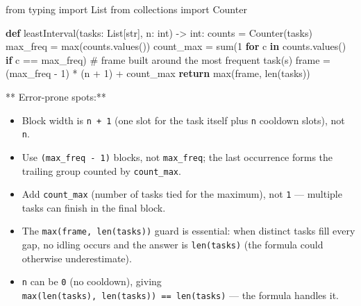 \documentclass[11pt]{article}
\providecommand{\tightlist}{\setlength{\itemsep}{1pt}\setlength{\parskip}{0pt}}
\newenvironment{Shaded}{\begin{snugshade}}{\end{snugshade}}
\newcommand{\BuiltInTok}[1]{\textcolor[rgb]{0.50,0.55,0.55}{#1}}
\newcommand{\CommentTok}[1]{\textcolor[rgb]{0.48,0.49,0.49}{#1}}
\newcommand{\ControlFlowTok}[1]{\textcolor[rgb]{0.99,0.74,0.29}{\textbf{#1}}}
\newcommand{\DecValTok}[1]{\textcolor[rgb]{0.96,0.45,0.00}{#1}}
\newcommand{\ImportTok}[1]{\textcolor[rgb]{0.15,0.68,0.38}{#1}}
\newcommand{\KeywordTok}[1]{\textcolor[rgb]{0.81,0.81,0.76}{\textbf{#1}}}
\newcommand{\NormalTok}[1]{\textcolor[rgb]{0.81,0.81,0.76}{#1}}
\newcommand{\OperatorTok}[1]{\textcolor[rgb]{0.81,0.81,0.76}{#1}}
\begin{document}

\begin{Shaded}
\begin{Highlighting}[]
\ImportTok{from}\NormalTok{ typing }\ImportTok{import}\NormalTok{ List}
\ImportTok{from}\NormalTok{ collections }\ImportTok{import}\NormalTok{ Counter}

\KeywordTok{def}\NormalTok{ leastInterval(tasks: List[}\BuiltInTok{str}\NormalTok{], n: }\BuiltInTok{int}\NormalTok{) }\OperatorTok{{-}\textgreater{}} \BuiltInTok{int}\NormalTok{:}
\NormalTok{    counts }\OperatorTok{=}\NormalTok{ Counter(tasks)}
\NormalTok{    max\_freq }\OperatorTok{=} \BuiltInTok{max}\NormalTok{(counts.values())}
\NormalTok{    count\_max }\OperatorTok{=} \BuiltInTok{sum}\NormalTok{(}\DecValTok{1} \ControlFlowTok{for}\NormalTok{ c }\KeywordTok{in}\NormalTok{ counts.values() }\ControlFlowTok{if}\NormalTok{ c }\OperatorTok{==}\NormalTok{ max\_freq)}
    \CommentTok{\# frame built around the most frequent task(s)}
\NormalTok{    frame }\OperatorTok{=}\NormalTok{ (max\_freq }\OperatorTok{{-}} \DecValTok{1}\NormalTok{) }\OperatorTok{*}\NormalTok{ (n }\OperatorTok{+} \DecValTok{1}\NormalTok{) }\OperatorTok{+}\NormalTok{ count\_max}
    \ControlFlowTok{return} \BuiltInTok{max}\NormalTok{(frame, }\BuiltInTok{len}\NormalTok{(tasks))}
\end{Highlighting}
\end{Shaded}

** Error-prone spots:**

\begin{itemize}
\tightlist
\item
  Block width is \texttt{n\ +\ 1} (one slot for the task itself plus \texttt{n} cooldown slots), not \texttt{n}.
\item
  Use \texttt{(max\_freq\ -\ 1)} blocks, not \texttt{max\_freq}; the last occurrence forms the trailing group counted by \texttt{count\_max}.
\item
  Add \texttt{count\_max} (number of tasks tied for the maximum), not \texttt{1} --- multiple tasks can finish in the final block.
\item
  The \texttt{max(frame,\ len(tasks))} guard is essential: when distinct tasks fill every gap, no idling occurs and the answer is \texttt{len(tasks)} (the formula could otherwise underestimate).
\item
  \texttt{n} can be \texttt{0} (no cooldown), giving \texttt{max(len(tasks),\ len(tasks))\ ==\ len(tasks)} --- the formula handles it.
\end{itemize}
\end{document}
